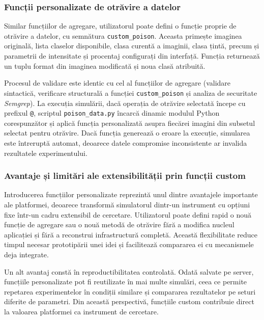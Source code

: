 \documentclass[../../main.tex]{subfiles}
\begin{document}
    \subsubsection{Funcții personalizate de otrăvire a datelor}

    Similar funcțiilor de agregare, utilizatorul poate defini o funcție proprie de otrăvire a datelor, cu semnătura \texttt{custom\_poison}. Aceasta primește imaginea originală, lista claselor disponibile, clasa curentă a imaginii, clasa țintă, precum și parametrii de intensitate și procentaj configurați din interfață. Funcția returnează un tuplu format din imaginea modificată și noua clasă atribuită.

    Procesul de validare este identic cu cel al funcțiilor de agregare (validare sintactică, verificare structurală a funcției \texttt{custom\_poison} și analiza de securitate \textit{Semgrep}). La execuția simulării, dacă operația de otrăvire selectată începe cu prefixul \texttt{@}, scriptul \texttt{poison\_data.py} încarcă dinamic modulul Python corespunzător și aplică funcția personalizată asupra fiecărei imagini din subsetul selectat pentru otrăvire. Dacă funcția generează o eroare la execuție, simularea este întreruptă automat, deoarece datele compromise inconsistente ar invalida rezultatele experimentului.

    \subsubsection{Avantaje și limitări ale extensibilității prin funcții custom}

    Introducerea funcțiilor personalizate reprezintă unul dintre avantajele importante ale platformei, deoarece transformă simulatorul dintr-un instrument cu opțiuni fixe într-un cadru extensibil de cercetare. Utilizatorul poate defini rapid o nouă funcție de agregare sau o nouă metodă de otrăvire fără a modifica nucleul aplicației și fără a reconstrui infrastructură completă. Această flexibilitate reduce timpul necesar prototipării unei idei și facilitează compararea ei cu mecanismele deja integrate.

    Un alt avantaj constă în reproductibilitatea controlată. Odată salvate pe server, funcțiile personalizate pot fi reutilizate în mai multe simulări, ceea ce permite repetarea experimentelor în condiții similare și compararea rezultatelor pe seturi diferite de parametri. Din această perspectivă, funcțiile custom contribuie direct la valoarea platformei ca instrument de cercetare.
\end{document}
